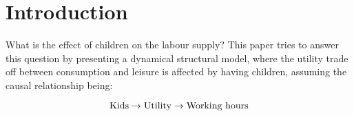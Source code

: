 \section{Introduction} 


What is the effect of children on the labour supply? This paper tries to answer this question by presenting a dynamical structural model, where the utility trade off between consumption and leisure is affected by having children, assuming the causal relationship being:

\begin{equation}
    \text{Kids} \rightarrow \text{Utility} \rightarrow \text{Working hours}
\end{equation}

